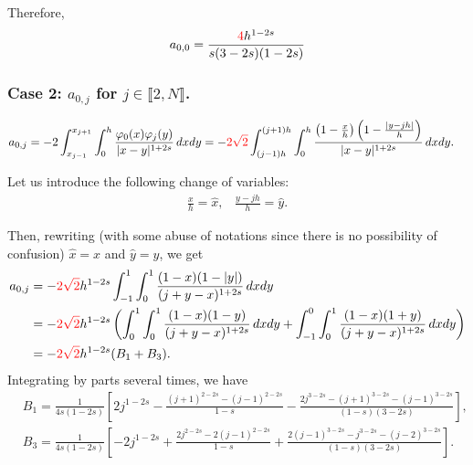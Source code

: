 \documentclass[10 pt]{article}
\newcommand\inter[1]{\llbracket #1\rrbracket}
\numberwithin{equation}{section}
\newcommand{\B}[1]{{\color{red} #1}}  %
\begin{document}
Therefore,
%
\begin{equation*}
    a_{0,0}=\frac{\B{4}h^{1 - 2 s}}{s (3 - 2 s) (1 - 2 s)}
\end{equation*}
%

\subsubsection{Case 2: $a_{0,j}$ for $j\in\inter{2,N}$.}

\begin{align*}
	a_{0,j}&=-2 \int_{x_{j-1}}^{x_{j+1}}\int_{0}^{h}\frac{\varphi_0(x)\varphi_j(y)}{|x-y|^{1+2s}}\,dxdy
=-\B{2\sqrt{2}} \int_{(j-1)h}^{(j+1)h}\int_0^{h}\frac{\left(1-\frac{x}{h}\right)\left(1-\frac{|y-jh|}{h}\right)}{|x-y|^{1+2s}}\,dxdy.
\end{align*}

Let us introduce the following change of variables:
\begin{align*}
	\frac{x}{h}=\hat{x},\;\;\; \frac{y-jh}{h}=\hat{y}.
\end{align*}

Then, rewriting (with some abuse of notations since there is no possibility of confusion) $\hat{x}=x$ and $\hat{y}=y$, we get 
\begin{align}\label{elem_noint_cv}
	a_{0,j}&=-\B{2\sqrt{2}}h^{1-2s} \int_{-1}^1\int_{0}^1\frac{(1-x)(1-|y|)}{(j+y-x)^{1+2s}}\,dxdy\\
	&=-\B{2\sqrt{2}}h^{1-2s} \left(\int_{0}^1\int_{0}^1\frac{(1-x)(1-y)}{(j+y-x)^{1+2s}}\,dxdy
	+\int_{-1}^0\int_{0}^1\frac{(1-x)(1+y)}{(j+y-x)^{1+2s}}\,dxdy\right)\\
	&=-\B{2\sqrt{2}}h^{1-2s}(B_1+B_3).
\end{align}
Integrating by parts several times, we have
\begin{align*}
	& B_1 = \frac{1}{4s(1-2s)}\left[2j^{1-2s}-\frac{(j+1)^{2-2s}-(j-1)^{2-2s}}{1-s}-\frac{2j^{3-2s}-(j+1)^{3-2s}-(j-1)^{3-2s}}{(1-s)(3-2s)}\right],\\
	& B_3 = \frac{1}{4s(1-2s)}\left[-2j^{1-2s}+\frac{2j^{2-2s}-2(j-1)^{2-2s}}{1-s}+\frac{2(j-1)^{3-2s}-j^{3-2s}-(j-2)^{3-2s}}{(1-s)(3-2s)}\right].
\end{align*} 
\end{document}
